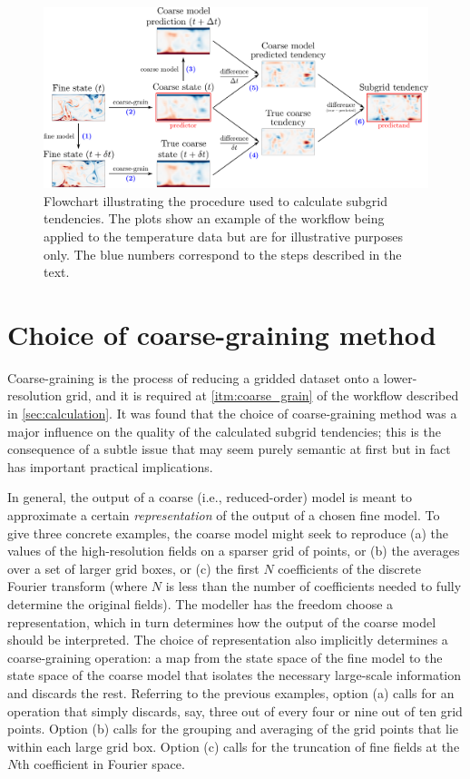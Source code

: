 \documentclass[../main.tex]{subfiles}
\begin{document}
\begin{figure}[ht]
    \centering
    \includegraphics[width=\linewidth]{figures/method_v2.pdf}
    \caption{
        Flowchart illustrating the procedure used to calculate subgrid
        tendencies. The plots show an example of the workflow being applied to
        the temperature data but are for illustrative purposes only. The blue
        numbers correspond to the steps described in the text.
    }
    \label{fig:method}
\end{figure}


\section{Choice of coarse-graining method} \label{sec:coarse_graining}
Coarse-graining is the process of reducing a gridded dataset onto a
lower-resolution grid, and it is required at \cref{itm:coarse_grain} of the
workflow described in \cref{sec:calculation}. It was found that the choice of
coarse-graining method was a major influence on the quality of the calculated
subgrid tendencies; this is the consequence of a subtle issue that may seem
purely semantic at first but in fact has important practical implications.

In general, the output of a coarse (i.e., reduced-order) model is meant to
approximate a certain \emph{representation} of the output of a chosen fine
model. To give three concrete examples, the coarse model might seek to
reproduce (a) the values of the high-resolution fields on a sparser grid of
points, or (b) the averages over a set of larger grid boxes, or (c) the first
$N$ coefficients of the discrete Fourier transform (where $N$ is less than the
number of coefficients needed to fully determine the original fields). The
modeller has the freedom choose a representation, which in turn determines how
the output of the coarse model should be interpreted. The choice of
representation also implicitly determines a coarse-graining operation: a map
from the state space of the fine model to the state space of the coarse model
that isolates the necessary large-scale information and discards the rest.
Referring to the previous examples, option (a) calls for an operation that
simply discards, say, three out of every four or nine out of ten grid points.
Option (b) calls for the grouping and averaging of the grid points that lie
within each large grid box. Option (c) calls for the truncation of fine fields
at the $N$th coefficient in Fourier space.
\end{document}
